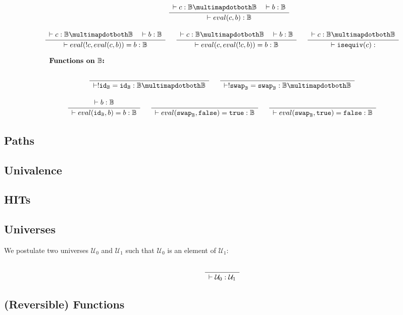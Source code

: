 \documentclass[format=acmlarge,review,natbib]{acmart}
\newcommand{\invc}[1]{!#1}
\newcommand{\evalone}[2]{eval(#1,#2)}
\newcommand{\isequiv}[1]{\mathtt{isequiv}(#1)}
\newcommand{\idc}{\mathtt{id}}
\newcommand{\swapc}{\mathtt{swap}}
\newcommand{\iso}{\multimapdotboth}
\newcommand{\fc}{\mathtt{false}}
\newcommand{\tc}{\mathtt{true}}
\newcommand{\boolt}{\mathbb{B}}
\newcommand{\uzero}{\mathcal{U}_0}
\newcommand{\uone}{\mathcal{U}_1}
\newcommand{\Rule}[2]{
\makebox{
$\displaystyle
\frac{\begin{array}{l}#1\\\end{array}}
{\begin{array}{l}#2\\\end{array}}$}}
\newcommand{\proves}{\vdash}
\newcommand{\jdg}[3]{#1 \proves #2 : #3}
\begin{document}
\[\begin{array}{c}
\quad
\quad
\Rule{\jdg{}{c}{\boolt\iso\boolt}
         \quad\jdg{}{b}{\boolt}}
        {\jdg{}{\evalone{c}{b}}{\boolt}}
\\
\\
\Rule{\jdg{}{c}{\boolt\iso\boolt}
         \quad\jdg{}{b}{\boolt}}
        {\jdg{}{\evalone{\invc{c}}{\evalone{c}{b}} = b}{\boolt}}
\quad
\Rule{\jdg{}{c}{\boolt\iso\boolt}
         \quad\jdg{}{b}{\boolt}}
        {\jdg{}{\evalone{c}{\evalone{\invc{c}}{b}} = b}{\boolt}}
\quad
\Rule{\jdg{}{c}{\boolt\iso\boolt}}
        {\jdg{}{\isequiv{c}}{}}
\\
\\
\noalign{\textbf{Functions on $\boolt$:}} \\
\Rule{}{\jdg{}{\invc{\idc_{\boolt} = \idc_{\boolt}}}{\boolt\iso\boolt}}
\quad
\Rule{}{\jdg{}{\invc{\swapc _{\boolt}} = \swapc _{\boolt}}{\boolt\iso\boolt}}
\\
\\
\Rule{\jdg{}{b}{\boolt}}
        {\jdg{}{\evalone{\idc_{\boolt}}{b} = b}{\boolt}}
\quad
\Rule{}
        {\jdg{}{\evalone{\swapc_{\boolt}}{\fc} = \tc}{\boolt}}
\quad
\Rule{}
        {\jdg{}{\evalone{\swapc_{\boolt}}{\tc} = \fc}{\boolt}}
\end{array}\]

\subsection{Paths}

\subsection{Univalence}

\subsection{HITs}

\newpage

\subsection{Universes}

We postulate two universes $\uzero$ and $\uone$ such that $\uzero$ is an element
of $\uone$:

\[
\Rule{}{\jdg{}{\uzero}{\uone}}
\]

\subsection{(Reversible) Functions}
\end{document}
